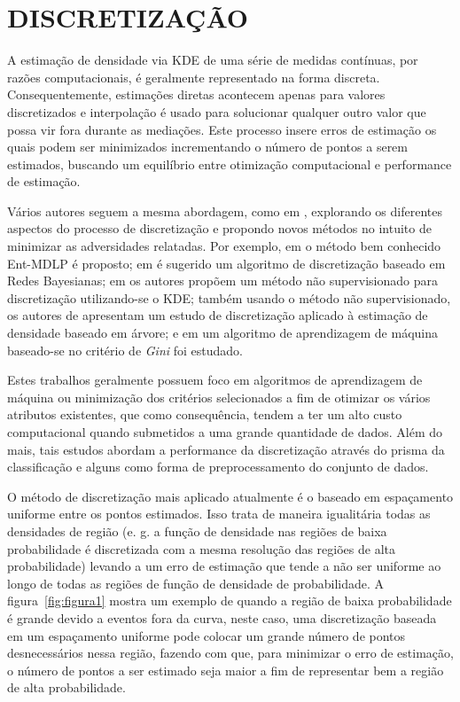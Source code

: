 \chapter{DISCRETIZAÇÃO} \label{cap:disc}
\vspace{-2cm}
A estimação de densidade via \ac{KDE} de uma série de medidas contínuas, por razões computacionais, é geralmente representado na forma discreta. Consequentemente, estimações diretas acontecem apenas para valores discretizados \cite{jones1989discretized} e interpolação é usado para solucionar qualquer outro valor que possa vir fora durante as mediações. Este processo insere erros de estimação os quais podem ser minimizados incrementando o número de pontos a serem estimados, buscando um equilíbrio entre otimização computacional e performance de estimação.

Vários autores seguem a mesma abordagem, como em \cite{jones1989discretized}, explorando os diferentes aspectos do processo de discretização e propondo novos métodos no intuito de minimizar as adversidades relatadas. Por exemplo, em \cite{fayyad1993multi} o método bem conhecido Ent-MDLP é proposto; em \cite{friedman1996discretizing} é sugerido um algoritmo de discretização baseado em Redes Bayesianas; em \cite{biba2007unsupervised} os autores propõem um método não supervisionado para discretização utilizando-se o \ac{KDE}; também usando o método não supervisionado, os autores de \cite{schmidberger2005unsupervised} apresentam um estudo de discretização aplicado à estimação de densidade baseado em árvore; e em \cite{zhang2007discretization} um algoritmo de aprendizagem de máquina baseado-se no critério de \textit{Gini} foi estudado. 

Estes trabalhos geralmente possuem foco em algoritmos de aprendizagem de máquina ou minimização dos critérios selecionados a fim de otimizar os vários atributos existentes, que como consequência, tendem a ter um alto custo computacional quando submetidos a uma grande quantidade de dados. Além do mais, tais estudos abordam a performance da discretização através do prisma da classificação e alguns como forma de preprocessamento do conjunto de dados.

O método de discretização mais aplicado atualmente é o baseado em espaçamento uniforme entre os pontos estimados. Isso trata de maneira igualitária todas as densidades de região (e. g. a função de densidade nas regiões de baixa probabilidade é discretizada com a mesma resolução das regiões de alta probabilidade) levando a um erro de estimação que tende a não ser uniforme ao longo de todas as regiões de função de densidade de probabilidade.
A figura~\ref{fig:figura1} mostra um exemplo de quando a região de baixa probabilidade é grande devido a eventos fora da curva, neste caso, uma discretização baseada em um espaçamento uniforme  pode colocar um grande número de pontos desnecessários nessa região, fazendo com que, para minimizar o erro de estimação, o número de pontos a ser estimado seja maior a fim de representar bem a região de alta probabilidade. %

